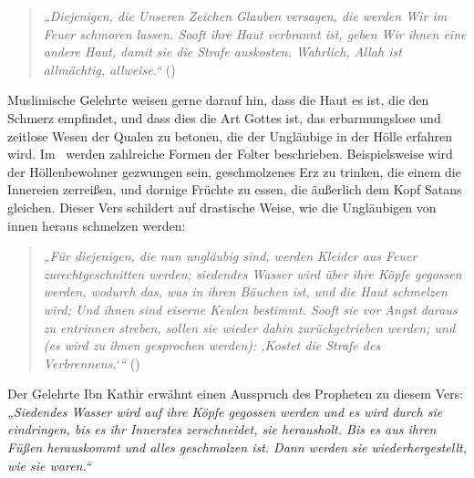 \documentclass[12pt]{memoir}
\begin{document}
\begin{quote}
\emph{%
„Diejenigen, die Unseren Zeichen Glauben versagen,
die werden Wir im Feuer schmoren lassen.
Sooft ihre Haut verbrannt ist, geben Wir ihnen eine andere Haut,
damit sie die Strafe auskosten.
Wahrlich, Allah ist allmächtig, allweise.“} ()
\end{quote}

Muslimische Gelehrte weisen gerne darauf hin,
dass die Haut es ist, die den Schmerz empfindet,
und dass dies die Art Gottes ist,
das erbarmungslose und zeitlose Wesen der Qualen zu betonen,
die der Ungläubige in der Hölle erfahren wird.
Im \Quran\ werden zahlreiche Formen der Folter beschrieben.
Beispielsweise wird der Höllenbewohner gezwungen sein,
geschmolzenes Erz zu trinken, die einem die Innereien zerreißen,
und dornige Früchte zu essen, die äußerlich dem Kopf Satans gleichen.
Dieser Vers schildert auf drastische Weise,
wie die Ungläubigen von innen heraus schmelzen werden:

\begin{quote}
\emph{%
„Für diejenigen, die nun ungläubig sind,
werden Kleider aus Feuer zurechtgeschnitten werden;
siedendes Wasser wird über ihre Köpfe gegossen werden,
wodurch das, was in ihren Bäuchen ist, und die Haut schmelzen wird;
Und ihnen sind eiserne Keulen bestimmt.
Sooft sie vor Angst daraus zu entrinnen streben,
sollen sie wieder dahin zurückgetrieben werden;
und (es wird zu ihnen gesprochen werden):
‚Kostet die Strafe des Verbrennens.‘“}
()
\end{quote}

Der Gelehrte Ibn Kathir erwähnt einen Ausspruch des Propheten
zu diesem Vers:
\emph{„Siedendes Wasser wird auf ihre Köpfe gegossen werden
und es wird durch sie eindringen,
bis es ihr Innerstes zerschneidet, sie herausholt.
Bis es aus ihren Füßen herauskommt und alles geschmolzen ist.
Dann werden sie wiederhergestellt, wie sie waren.“}
\end{document}
